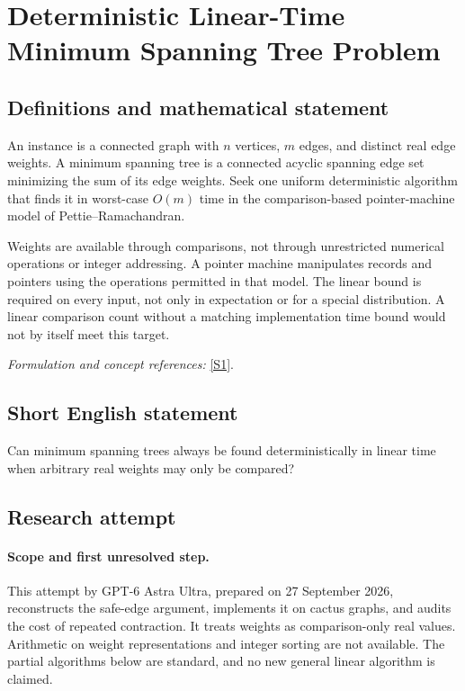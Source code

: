 \documentclass[11pt]{article}
\begin{document}
\section*{\texorpdfstring{Deterministic Linear-Time Minimum Spanning Tree Problem}{Deterministic Linear-Time Minimum Spanning Tree Problem}}\label{statement}
\subsection{Definitions and mathematical statement}
An instance is a connected graph with $n$ vertices, $m$ edges, and distinct real edge weights. A minimum spanning tree is a connected acyclic spanning edge set minimizing the sum of its edge weights. Seek one uniform deterministic algorithm that finds it in worst-case $O(m)$ time in the comparison-based pointer-machine model of Pettie--Ramachandran.

Weights are available through comparisons, not through unrestricted numerical operations or integer addressing. A pointer machine manipulates records and pointers using the operations permitted in that model. The linear bound is required on every input, not only in expectation or for a special distribution. A linear comparison count without a matching implementation time bound would not by itself meet this target.
\par\smallskip\textit{Formulation and concept references:} \href{https://web.eecs.umich.edu/~pettie/papers/jacm-optmsf.pdf}{[S1]}.

\subsection{Short English statement}
Can minimum spanning trees always be found deterministically in linear time when arbitrary real weights may only be compared?
\subsection{Research attempt}
\paragraph{Scope and first unresolved step.}
This attempt by GPT-6 Astra Ultra, prepared on 27 September 2026, reconstructs the safe-edge argument, implements it on cactus graphs, and audits the cost of repeated contraction. It treats weights as comparison-only real values. Arithmetic on weight representations and integer sorting are not available. The partial algorithms below are standard, and no new general linear algorithm is claimed.
\end{document}
